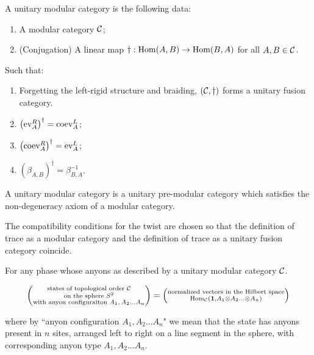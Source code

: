 \begin{defn} A unitary modular category is the following data:

\begin{enumerate}
\item A modular category ${\mathcal C}$;
\item (Conjugation) A linear map $\dagger: \operatorname{Hom}(A,B)\to \operatorname{Hom}(B,A)$ for all $A,B\in {\mathcal C}$.
\end{enumerate}

Such that:

\begin{enumerate}
\item Forgetting the left-rigid structure and braiding, $\left({\mathcal C},\dagger\right)$ forms a unitary fusion category.
\item $\left(\operatorname{ev}_{A}^R\right)^{\dagger}=\operatorname{coev}_{A}^L$;
\item $\left(\operatorname{coev}_{A}^R\right)^{\dagger}=\operatorname{ev}_{A}^L$;
\item $\left(\beta_{A,B}\right)^{\dagger}=\beta_{B,A}^{-1}$.
\end{enumerate}
\end{defn}

\begin{defn} A unitary modular category is a unitary pre-modular category which satisfies the non-degeneracy axiom of a modular category.
\end{defn}

\begin{rem} The compatibility conditions for the twist are chosen so that the definition of trace as a modular category and the definition of trace as a unitary fusion category coincide.
\end{rem}

\begin{dict} For any phase whose anyons as described by a unitary modular category ${\mathcal C}$.

\begin{equation}\label{dict-state-formula}
\left(\substack{\text{states of topological order ${\mathcal C}$} \\ \text{on the sphere $S^2$} \\ \text{with anyon configuraiton $A_1,A_2...A _n$}}\right)
=
\left(
\substack{
\text{normalized vectors in the Hilbert space}\\
\operatorname{Hom}_{\mathcal C}({\mathbf 1}, A_1\otimes A_2... \otimes A_n)
}
\right)
\end{equation}

where by ``anyon configuration $A_1,A_2...A_n$" we mean that the state has anyons present in $n$ sites, arranged left to right on a line segment in the sphere, with corresponding anyon type $A_1,A_2...A_n$.
\end{dict}


